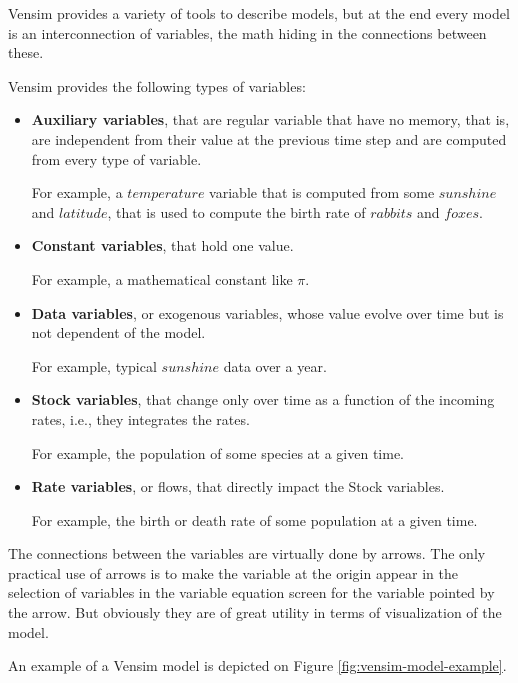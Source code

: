 Vensim provides a variety of tools to describe models, but at the end every model is an interconnection of variables, the math hiding in the connections between these. 

Vensim provides the following types of variables:
\begin{itemize}
    \item \textbf{Auxiliary variables}, that are regular variable that have no memory, that is, are independent from their value at the previous time step and are computed from every type of variable.

    For example, a $temperature$ variable that is computed from some $sunshine$ and $latitude$, that is used to compute the birth rate of $rabbits$ and $foxes$.

    \item \textbf{Constant variables}, that hold one value.
    
    For example, a mathematical constant like $\pi$.

    \item \textbf{Data variables}, or exogenous variables, whose value evolve over time but is not dependent of the model.

    For example, typical $sunshine$ data over a year.

    \item \textbf{Stock variables}, that change only over time as a function of the incoming rates, i.e., they integrates the rates.

    For example, the population of some species at a given time.

    \item \textbf{Rate variables}, or flows, that directly impact the Stock variables. 

    For example, the birth or death rate of some population at a given time.
\end{itemize}

The connections between the variables are virtually done by arrows. The only practical use of arrows is to make the variable at the origin appear in the selection of variables in the variable equation screen for the variable pointed by the arrow. But obviously they are of great utility in terms of visualization of the model.

An example of a Vensim model is depicted on Figure \ref{fig:vensim-model-example}.

